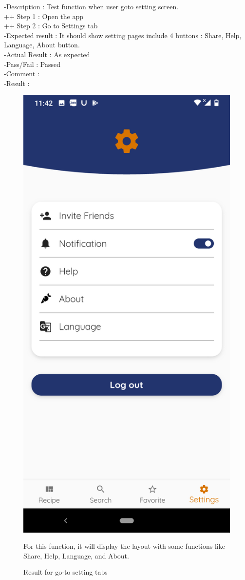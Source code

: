 \documentclass{article}
\begin{document}
    -Description : Test function when user goto setting screen. \\
    ++ Step 1 : Open the app  \\
    ++ Step 2 : Go to Settings tab \\
    -Expected result : It should show setting pages include 4 buttons : Share, Help, Language, About button. \\
    -Actual Result : As expected \\
    -Pass/Fail : Passed \\
    -Comment :  \\
    -Result : 
    \begin{figure}[h!]
    \centering
    \includegraphics[scale=0.20]{Images/Settings.jpg}
    \caption{Result for go-to setting tabs}
    For this function, it will display the layout with some functions like Share, Help, Language, and About.
    \label{fig:cookingbook}
    \end{figure}
 \newpage
\end{document}
